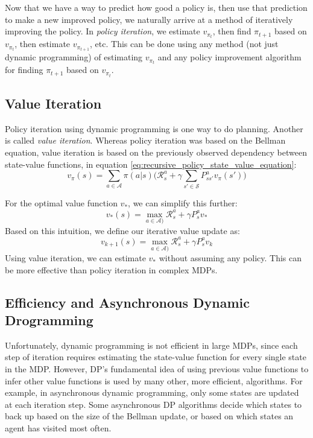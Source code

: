 \documentclass{article}
\newcommand{\ita}{\textit}
\begin{document}
Now that we have a way to predict how good a policy is, then use that prediction to make a new improved policy, we naturally arrive at a method of iteratively improving the policy. In \ita{policy iteration}, we estimate $v_{\pi_t}$, then find $\pi_{t+1}$ based on $v_{\pi_t}$, then estimate $v_{\pi_{t+1}}$, etc. This can be done using any method (not just dynamic programming) of estimating $v_{\pi_t}$ and any policy improvement algorithm for finding $\pi_{t+1}$ based on $v_{\pi_t}$.

\subsection{Value Iteration}

Policy iteration using dynamic programming is one way to do planning. Another is called \ita{value iteration}. Whereas policy iteration was based on the Bellman equation, value iteration is based on the previously observed dependency between state-value functions, in equation \eqref{eq:recursive_policy_state_value_equation}:
$$v_\pi(s) = \sum_{a\in\mathcal{A}} \pi(a|s)\bigg(\mathcal{R}^a_s + \gamma\sum_{s'\in\mathcal{S}}P^a_{ss'}v_\pi(s')\bigg)$$

For the optimal value function $v_*$, we can simplify this further:
\begin{equation}\label{eq:bellman_optimal_value_function}
v_*(s) = \max_{a\in\mathcal{A})} \mathcal{R}^a_s + \gamma P^a_s v_*
\end{equation}
Based on this intuition, we define our iterative value update as:
\begin{equation}\label{eq:dp_value_iteration_update}
v_{k+1}(s) = \max_{a\in\mathcal{A})} \mathcal{R}^a_s + \gamma P^a_s v_k
\end{equation}
Using value iteration, we can estimate $v_*$ without assuming any policy. This can be more effective than policy iteration in complex MDPs.

\subsection{Efficiency and Asynchronous Dynamic Drogramming}

Unfortunately, dynamic programming is not efficient in large MDPs, since each step of iteration requires estimating the state-value function for every single state in the MDP. However, DP's fundamental idea of using previous value functions to infer other value functions is used by many other, more efficient, algorithms. For example, in asynchronous dynamic programming, only some states are updated at each iteration step. Some asynchronous DP algorithms decide which states to back up based on the size of the Bellman update, or based on which states an agent has visited most often.
\end{document}
